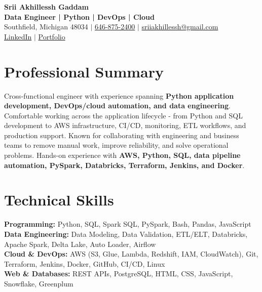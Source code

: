 \documentclass[letterpaper,10pt]{article}
\begin{document}
\fontsize{9.35pt}{10.45pt}\selectfont

\begin{center}
    {\LARGE \textbf{Srii Akhillessh Gaddam}} \\[-1pt]
    \textbf{Data Engineer | Python | DevOps | Cloud} \\[2pt]
    Southfield, Michigan 48034 $|$
    \href{tel:6468752400}{646-875-2400} $|$
    \href{mailto:sriiakhillessh@gmail.com}{sriiakhillessh@gmail.com} \\[1pt]
    \href{https://www.linkedin.com/in/srii-akhiilessh-gaddam-b48668191/}{LinkedIn} $|$
    \href{https://sriiakhillesshg.github.io/portfolio/}{Portfolio}
\end{center}
\vspace{-8pt}

\section{Professional Summary}
\small{Cross-functional engineer with experience spanning \textbf{Python application development, DevOps/cloud automation, and data engineering}. Comfortable working across the application lifecycle - from Python and SQL development to AWS infrastructure, CI/CD, monitoring, ETL workflows, and production support. Known for collaborating with engineering and business teams to remove manual work, improve reliability, and solve operational problems. Hands-on experience with \textbf{AWS, Python, SQL, data pipeline automation, PySpark, Databricks, Terraform, Jenkins, and Docker}.}

\section{Technical Skills}
\small{
\textbf{Programming:} Python, SQL, Spark SQL, PySpark, Bash, Pandas, JavaScript \\
\textbf{Data Engineering:} Data Modeling, Data Validation, ETL/ELT, Databricks, Apache Spark, Delta Lake, Auto Loader, Airflow \\
\textbf{Cloud \& DevOps:} AWS (S3, Glue, Lambda, Redshift, IAM, CloudWatch), Git, Terraform, Jenkins, Docker, GitHub, CI/CD, Linux \\
\textbf{Web \& Databases:} REST APIs, PostgreSQL, HTML, CSS, JavaScript, Snowflake, Greenplum
}

\end{document}
